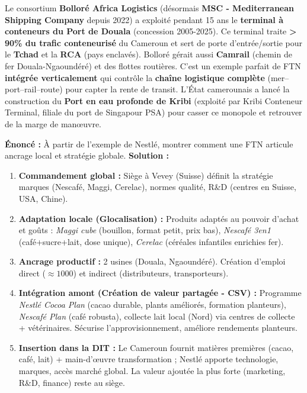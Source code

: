 \documentclass[11pt]{article}
\begin{document}
\begin{savaistu}
Le consortium \textbf{Bolloré Africa Logistics} (désormais \textbf{MSC - Mediterranean Shipping Company} depuis 2022) a exploité pendant 15 ans le \textbf{terminal à conteneurs du Port de Douala} (concession 2005-2025). Ce terminal traite \textbf{> 90\% du trafic conteneurisé} du Cameroun et sert de porte d'entrée/sortie pour le \textbf{Tchad} et la \textbf{RCA} (pays enclavés). Bolloré gérait aussi \textbf{Camrail} (chemin de fer Douala-Ngaoundéré) et des flottes routières. C'est un exemple parfait de FTN \textbf{intégrée verticalement} qui contrôle la \textbf{chaîne logistique complète} (mer–port–rail–route) pour capter la rente de transit. L'État camerounais a lancé la construction du \textbf{Port en eau profonde de Kribi} (exploité par Kribi Conteneur Terminal, filiale du port de Singapour PSA) pour casser ce monopole et retrouver de la marge de manœuvre.
\end{savaistu}

\begin{exoresolu}
\textbf{Énoncé :} À partir de l'exemple de Nestlé, montrer comment une FTN articule ancrage local et stratégie globale.
\textbf{Solution :}
\begin{enumerate}
    \item \textbf{Commandement global :} Siège à Vevey (Suisse) définit la stratégie marques (Nescafé, Maggi, Cerelac), normes qualité, R\&D (centres en Suisse, USA, Chine).
    \item \textbf{Adaptation locale (Glocalisation) :} Produits adaptés au pouvoir d'achat et goûts : \emph{Maggi cube} (bouillon, format petit, prix bas), \emph{Nescafé 3en1} (café+sucre+lait, dose unique), \emph{Cerelac} (céréales infantiles enrichies fer).
    \item \textbf{Ancrage productif :} 2 usines (Douala, Ngaoundéré). Création d'emploi direct ($\approx 1000$) et indirect (distributeurs, transporteurs).
    \item \textbf{Intégration amont (Création de valeur partagée - CSV) :} Programme \emph{Nestlé Cocoa Plan} (cacao durable, plants améliorés, formation planteurs), \emph{Nescafé Plan} (café robusta), collecte lait local (Nord) via centres de collecte + vétérinaires. Sécurise l'approvisionnement, améliore rendements planteurs.
    \item \textbf{Insertion dans la DIT :} Le Cameroun fournit matières premières (cacao, café, lait) + main-d'œuvre transformation ; Nestlé apporte technologie, marques, accès marché global. La valeur ajoutée la plus forte (marketing, R\&D, finance) reste au siège.
\end{enumerate}
\end{exoresolu}
\end{document}
